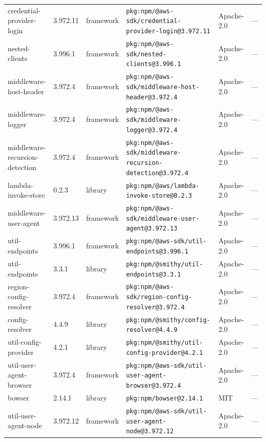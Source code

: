 \documentclass[11pt,a4paper]{article}
\begin{document}
\begin{longtable}{|p{4cm}|p{2cm}|p{1.6cm}|p{5cm}|p{1.5cm}|p{3.5cm}|}
\raggedright credential-provider-login & 3.972.11 & framework & \small\texttt{pkg:npm/@aws-sdk/credential-provider-login@3.972.11} & Apache-2.0 & \small — \\
\raggedright nested-clients & 3.996.1 & framework & \small\texttt{pkg:npm/@aws-sdk/nested-clients@3.996.1} & Apache-2.0 & \small — \\
\raggedright middleware-host-header & 3.972.4 & framework & \small\texttt{pkg:npm/@aws-sdk/middleware-host-header@3.972.4} & Apache-2.0 & \small — \\
\raggedright middleware-logger & 3.972.4 & framework & \small\texttt{pkg:npm/@aws-sdk/middleware-logger@3.972.4} & Apache-2.0 & \small — \\
\raggedright middleware-recursion-detection & 3.972.4 & framework & \small\texttt{pkg:npm/@aws-sdk/middleware-recursion-detection@3.972.4} & Apache-2.0 & \small — \\
\raggedright lambda-invoke-store & 0.2.3 & library & \small\texttt{pkg:npm/@aws/lambda-invoke-store@0.2.3} & Apache-2.0 & \small — \\
\raggedright middleware-user-agent & 3.972.13 & framework & \small\texttt{pkg:npm/@aws-sdk/middleware-user-agent@3.972.13} & Apache-2.0 & \small — \\
\raggedright util-endpoints & 3.996.1 & framework & \small\texttt{pkg:npm/@aws-sdk/util-endpoints@3.996.1} & Apache-2.0 & \small — \\
\raggedright util-endpoints & 3.3.1 & library & \small\texttt{pkg:npm/@smithy/util-endpoints@3.3.1} & Apache-2.0 & \small — \\
\raggedright region-config-resolver & 3.972.4 & framework & \small\texttt{pkg:npm/@aws-sdk/region-config-resolver@3.972.4} & Apache-2.0 & \small — \\
\raggedright config-resolver & 4.4.9 & library & \small\texttt{pkg:npm/@smithy/config-resolver@4.4.9} & Apache-2.0 & \small — \\
\raggedright util-config-provider & 4.2.1 & library & \small\texttt{pkg:npm/@smithy/util-config-provider@4.2.1} & Apache-2.0 & \small — \\
\raggedright util-user-agent-browser & 3.972.4 & framework & \small\texttt{pkg:npm/@aws-sdk/util-user-agent-browser@3.972.4} & Apache-2.0 & \small — \\
\raggedright bowser & 2.14.1 & library & \small\texttt{pkg:npm/bowser@2.14.1} & MIT & \small — \\
\raggedright util-user-agent-node & 3.972.12 & framework & \small\texttt{pkg:npm/@aws-sdk/util-user-agent-node@3.972.12} & Apache-2.0 & \small — \\

\end{longtable}
\end{document}
